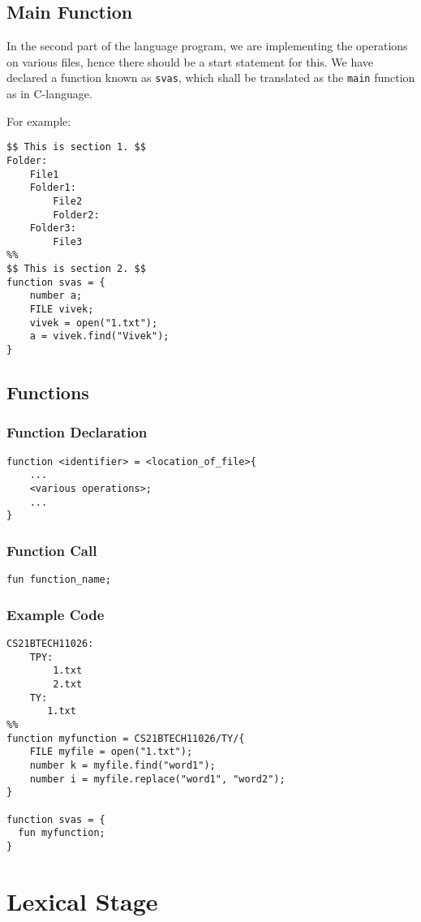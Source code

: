\documentclass{article}
\begin{document}
\subsection{Main Function}
In the second part of the language program, we are implementing the operations on various files, hence there should be a start statement for this. We have declared a function known as \texttt{svas}, which shall be translated as the \texttt{main} function as in C-language.

For example:
\begin{verbatim}
$$ This is section 1. $$
Folder:
    File1
    Folder1:
        File2
        Folder2:
    Folder3:
        File3
%%
$$ This is section 2. $$
function svas = {
    number a;
    FILE vivek;
    vivek = open("1.txt");
    a = vivek.find("Vivek");
}
\end{verbatim}
\subsection{Functions}
\subsubsection{Function Declaration}
\begin{verbatim}
function <identifier> = <location_of_file>{
    ...
    <various operations>;
    ...
}
\end{verbatim}

\subsubsection{Function Call}
\begin{verbatim}
fun function_name;
\end{verbatim}

\subsubsection{Example Code}
\begin{verbatim}
CS21BTECH11026:
    TPY:
        1.txt
        2.txt
    TY:
       1.txt
%%
function myfunction = CS21BTECH11026/TY/{
    FILE myfile = open("1.txt");
    number k = myfile.find("word1");
    number i = myfile.replace("word1", "word2");
}

function svas = {
  fun myfunction;
}
\end{verbatim}

\section{Lexical Stage}
\end{document}
